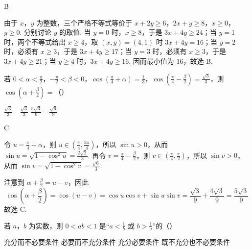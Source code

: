 \begin{answer}
B
\end{answer}

\begin{solution}
由于 \(x\)，\(y\) 为整数，三个严格不等式等价于
\(x+2y\geqslant 6\)，\(2x+y\geqslant 8\)，\(x\geqslant 0\)，\(y\geqslant 0\).
分别讨论 \(y\) 的取值. 当 \(y=0\) 时，\(x\geqslant 8\)，于是 \(3x+4y\geqslant 24\)；当 \(y=1\) 时，两个不等式给出 \(x\geqslant 4\)，取 \((x,y)=(4,1)\) 时 \(3x+4y=16\)；当 \(y=2\) 时，必须有 \(x\geqslant 3\)，于是 \(3x+4y\geqslant 17\)；当 \(y=3\) 时，必须有 \(x\geqslant 3\)，于是 \(3x+4y\geqslant 21\)；当 \(y\geqslant 4\) 时，\(3x+4y\geqslant 16\). 因而最小值为 \(16\)，故选 B.
\end{solution}

\begin{problem}
若 \(0 < \alpha < \frac{\pi}{2}\)，\(-\frac{\pi}{2} < \beta < 0\)，\(\cos \left(\frac{\pi}{4} + \alpha\right) = \frac{1}{3}\)，\(\cos \left(\frac{\pi}{4} - \frac{\beta}{2}\right) = \frac{\sqrt{3}}{3}\)，则 \(\cos \left(\alpha + \frac{\beta}{2}\right) =\)（\quad）

\choices
    {\(\frac{\sqrt{3}}{3}\)}
    {\(-\frac{\sqrt{3}}{3}\)}
    {\(\frac{5\sqrt{3}}{9}\)}
    {\(-\frac{\sqrt{6}}{9}\)}
\end{problem}

\begin{answer}
C
\end{answer}

\begin{solution}
令 \(u=\frac{\pi}{4}+\alpha\)，则 \(u\in\left(\frac{\pi}{4},\frac{3\pi}{4}\right)\)，所以 \(\sin u>0\)，从而 \(\sin u=\sqrt{1-\cos^2u}=\frac{2\sqrt{2}}{3}\). 再令 \(v=\frac{\pi}{4}-\frac{\beta}{2}\)，则 \(v\in\left(\frac{\pi}{4},\frac{\pi}{2}\right)\)，所以 \(\sin v>0\)，从而 \(\sin v=\sqrt{1-\cos^2v}=\frac{\sqrt{6}}{3}\).

注意到 \(\alpha+\frac{\beta}{2}=u-v\)，因此
\[
\cos\left(\alpha+\frac{\beta}{2}\right)=\cos(u-v)=\cos u\cos v+\sin u\sin v=\frac{\sqrt{3}}{9}+\frac{4\sqrt{3}}{9}=\frac{5\sqrt{3}}{9}
\]
故选 C.
\end{solution}

\begin{problem}
若 \(a\)，\(b\) 为实数，则 \(0 < ab < 1\) 是“\(a < \frac{1}{b}\) 或 \(b > \frac{1}{a}\)”的（\quad）

\choices
    {充分而不必要条件}
    {必要而不充分条件}
    {充分必要条件}
    {既不充分也不必要条件}
\end{problem}

